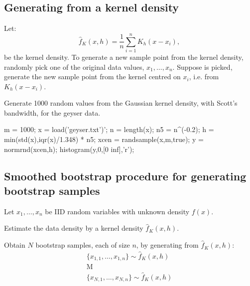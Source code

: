 \subsection{Generating from a kernel density}
Let:$$\hat{f}_K(x,h)=\frac{1}{n}\sum^{n}_{i=1}K_h(x-x_i),$$
 be the kernel density.  To generate a new sample point from the kernel density, randomly pick one of the original data values, $x_1,\ldots,x_n$. Suppose   is picked, generate the new sample point from the kernel centred on $x_i$, i.e. from $K_h(x-x_i)$.

\begin{labwork}
Generate 1000 random values from the Gaussian kernel density, with Scott's bandwidth, for the geyser data.
\begin{VrbM}
m = 1000; %
x = load('geyser.txt')';
n = length(x);
n5 = n^(-0.2);
h = min(std(x),iqr(x)/1.348) * n5; %
xcen = randsample(x,m,true); %
y = normrnd(xcen,h); %
histogram(y,0,[0 inf],'r');
\end{VrbM}
\end{labwork}

\subsection{Smoothed bootstrap procedure for generating bootstrap samples}
Let $x_1,\ldots,x_n$ be IID random variables with unknown density $f(x)$.
\begin{asparaenum}[(a)]
\item Estimate the data density by a kernel density $\hat{f}_K(x,h)$.

\item	Obtain $N$ bootstrap samples, each of size $n$, by generating from $\hat{f}_K(x,h)$:
$$\begin{array}{c}
\{x_{1,1},\ldots,x_{1,n}\}\sim\hat{f}_K(x,h)\\
\textrm{M}\\
\{x_{N,1},\ldots,x_{N,n}\}\sim\hat{f}_K(x,h)\\
\end{array}$$
\end{asparaenum}

